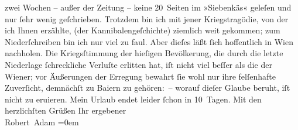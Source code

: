 \begin{ledgroupsized}[t]{13cm}
               zwei Wochen – außer der Zeitung – keine 20 Seiten im »Siebenkäs« geleſen und nur ſehr wenig geſchrieben. Trotzdem bin ich mit
               jener Kriegstragödie, von
                  der ich Ihnen erzählte, (der
               Kannibalengeſchichte) ziemlich weit gekommen; zum Niederſchreiben bin ich nur viel zu
               faul. Aber dieſes läßt ſich hoffentlich in Wien
               nachholen.\pend
           \pstart
           Die Kriegsſtimmung der hieſigen Bevölkerung, die durch die letzte Niederlage
               ſchreckliche Verluſte erlitten hat, iſt nicht viel beſſer als die der Wiener; vor Äußerungen der Erregung bewahrt ſie
               wohl nur ihre felſenhafte Zuverſicht, demnächſt zu Baiern zu gehören: – worauf dieſer Glaube beruht, iſt nicht zu eruieren.\pend
           \pstart
           Mein Urlaub endet leider ſchon in 10 Tagen.\pend
           \pstart
           Mit den herzlichſten Grüßen\pend
           \pstart
           Ihr ergebener{\\[\baselineskip]}\spacefill\mbox{Robert Adam}\pend
           \leftskip=0em{}
         
         \endnumbering{}\end{ledgroupsized}  \newcommand{\dateiname}{L02289}\newcommand{\titel}{Robert Adam an Arthur Schnitzler, 17. 7. 1918}\newcommand{\editorInnen}{Martin Anton Müller und Gerd-Hermann Susen}
      